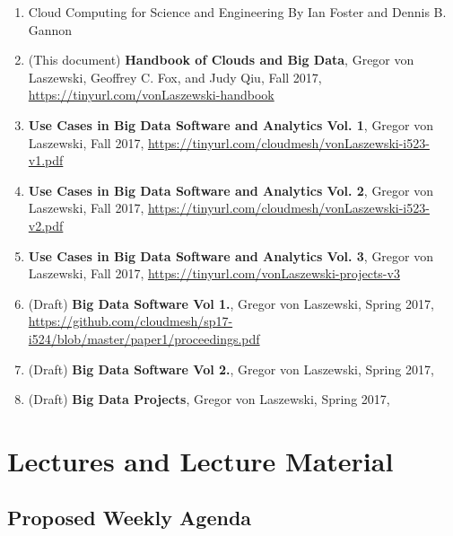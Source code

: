 \begin{enumerate}

\item Cloud Computing for Science and Engineering By Ian Foster and
  Dennis
  B. Gannon


\item (This document) {\bf Handbook of Clouds and Big Data}, Gregor von Laszewski,
  Geoffrey C. Fox, and Judy Qiu, Fall 2017,
  \url{https://tinyurl.com/vonLaszewski-handbook}

\item {\bf Use Cases in Big Data Software and
  Analytics Vol. 1}, Gregor von Laszewski, Fall 2017,
  \url{https://tinyurl.com/cloudmesh/vonLaszewski-i523-v1.pdf}

\item {\bf Use Cases in Big Data Software and
  Analytics Vol. 2}, Gregor von Laszewski, Fall 2017, \url{https://tinyurl.com/cloudmesh/vonLaszewski-i523-v2.pdf}

\item  {\bf Use Cases in Big Data Software and
  Analytics Vol. 3}, Gregor von Laszewski, Fall 2017, 
  \url{https://tinyurl.com/vonLaszewski-projects-v3}


\item (Draft) {\bf Big Data Software Vol 1.}, Gregor von Laszewski, Spring 2017,
\url{https://github.com/cloudmesh/sp17-i524/blob/master/paper1/proceedings.pdf}

\item (Draft) {\bf Big Data Software Vol 2.}, Gregor von Laszewski, Spring 2017,

\item (Draft) {\bf Big Data Projects}, Gregor von Laszewski, Spring 2017,

\end{enumerate}

\section{Lectures and Lecture Material}


\subsection{Proposed Weekly Agenda}

